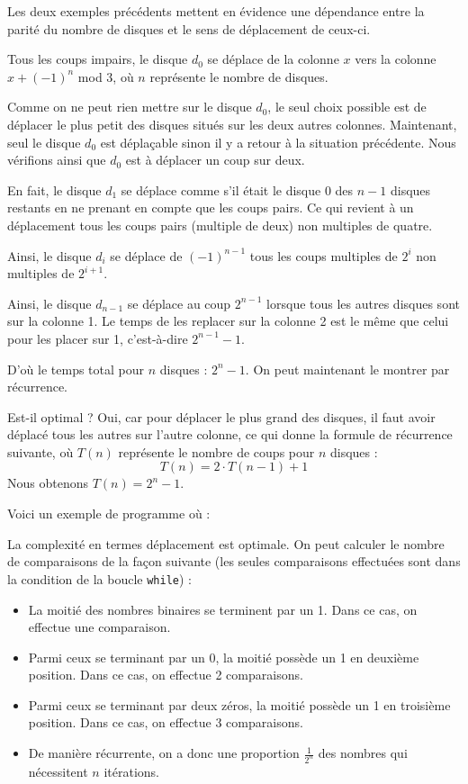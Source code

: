 \Q
Les deux exemples précédents mettent en évidence une dépendance entre la parité du nombre de disques et le sens de déplacement de ceux-ci.
\medskip

Tous les coups impairs, le disque $d_0$ se déplace de la colonne $x$ vers la colonne $x+(-1)^n$ mod 3, où $n$ représente le nombre de disques.
\medskip

Comme on ne peut rien mettre sur le disque $d_0$, le seul choix possible est de déplacer le plus petit des disques situés sur les deux autres colonnes. Maintenant, seul le disque $d_0$ est déplaçable sinon il y a retour à la situation précédente. Nous vérifions ainsi que $d_0$ est à déplacer un coup sur deux.

\Q
En fait, le disque $d_1$ se déplace comme s'il était le disque 0 des $n-1$ disques restants en ne prenant en compte que les coups pairs. Ce qui revient à un déplacement tous les coups pairs (multiple de deux) non multiples de quatre.
\medskip

Ainsi, le disque $d_i$ se déplace de $(-1)^{n-1}$ tous les coups multiples de $2^i$ non multiples de $2^{i+1}$.
\medskip

Ainsi, le disque $d_{n-1}$ se déplace au coup $2^{n-1}$ lorsque tous les autres disques sont sur la colonne 1. Le temps de les replacer sur la colonne 2 est le même que celui pour les placer sur 1, c'est-à-dire $2^{n-1}-1$.
\medskip

D'où le temps total pour $n$ disques : $2^n-1$. On peut maintenant le montrer par récurrence.
\medskip

Est-il optimal ? Oui, car pour déplacer le plus grand des disques, il faut avoir déplacé tous les autres sur l'autre colonne, ce qui donne la formule de récurrence suivante, où $T(n)$ représente le nombre de coups pour $n$ disques :
\[
    T(n) = 2\cdot T(n-1)+1
\]
Nous obtenons $T(n)=2^n-1$.
\medskip

Voici un exemple de programme où :



La complexité en termes déplacement est optimale. On peut calculer le nombre de comparaisons de la façon suivante (les seules comparaisons effectuées sont dans la condition de la boucle \texttt{while}) :
\begin{itemize}
    \item La moitié des nombres binaires se terminent par un 1. Dans ce cas, on effectue une comparaison.
    \item Parmi ceux se terminant par un 0, la moitié possède un 1 en deuxième position. Dans ce cas, on effectue 2 comparaisons.
    \item Parmi ceux se terminant par deux zéros, la moitié possède un 1 en troisième position. Dans ce cas, on effectue 3 comparaisons.
    \item De manière récurrente, on a donc une proportion $\frac{1}{2^n}$ des nombres qui nécessitent $n$ itérations.
\end{itemize}
\medskip

